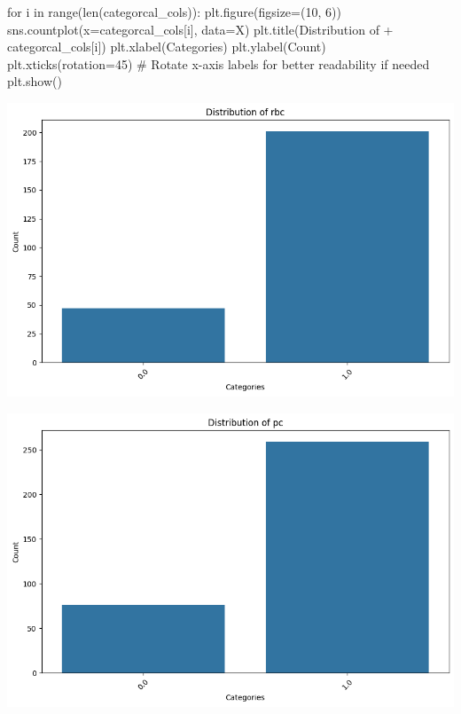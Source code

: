 \documentclass[
  11pt,
  letterpaper,
  DIV=11,
  numbers=noendperiod]{scrartcl}
\newenvironment{Shaded}{\begin{snugshade}}{\end{snugshade}}
\newcommand{\BuiltInTok}[1]{\textcolor[rgb]{0.00,0.23,0.31}{#1}}
\newcommand{\CommentTok}[1]{\textcolor[rgb]{0.37,0.37,0.37}{#1}}
\newcommand{\ControlFlowTok}[1]{\textcolor[rgb]{0.00,0.23,0.31}{#1}}
\newcommand{\DecValTok}[1]{\textcolor[rgb]{0.68,0.00,0.00}{#1}}
\newcommand{\KeywordTok}[1]{\textcolor[rgb]{0.00,0.23,0.31}{#1}}
\newcommand{\NormalTok}[1]{\textcolor[rgb]{0.00,0.23,0.31}{#1}}
\newcommand{\OperatorTok}[1]{\textcolor[rgb]{0.37,0.37,0.37}{#1}}
\newcommand{\StringTok}[1]{\textcolor[rgb]{0.13,0.47,0.30}{#1}}
\begin{document}
\begin{Shaded}
\begin{Highlighting}[]

\ControlFlowTok{for}\NormalTok{ i }\KeywordTok{in} \BuiltInTok{range}\NormalTok{(}\BuiltInTok{len}\NormalTok{(categorcal\_cols)):}
\NormalTok{    plt.figure(figsize}\OperatorTok{=}\NormalTok{(}\DecValTok{10}\NormalTok{, }\DecValTok{6}\NormalTok{))}
\NormalTok{    sns.countplot(x}\OperatorTok{=}\NormalTok{categorcal\_cols[i], data}\OperatorTok{=}\NormalTok{X)}
\NormalTok{    plt.title(}\StringTok{\textquotesingle{}Distribution of \textquotesingle{}}\OperatorTok{+}\NormalTok{ categorcal\_cols[i])}
\NormalTok{    plt.xlabel(}\StringTok{\textquotesingle{}Categories\textquotesingle{}}\NormalTok{)}
\NormalTok{    plt.ylabel(}\StringTok{\textquotesingle{}Count\textquotesingle{}}\NormalTok{)}
\NormalTok{    plt.xticks(rotation}\OperatorTok{=}\DecValTok{45}\NormalTok{)  }\CommentTok{\# Rotate x{-}axis labels for better readability if needed}
\NormalTok{    plt.show()}
\end{Highlighting}
\end{Shaded}

\includegraphics{Assignment6_Final version_files/figure-pdf/cell-15-output-1.png}

\includegraphics{Assignment6_Final version_files/figure-pdf/cell-15-output-2.png}
\end{document}
